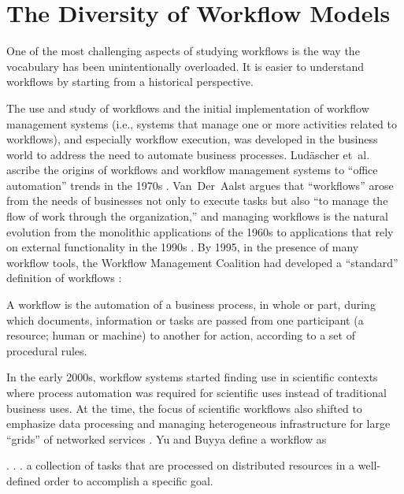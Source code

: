 \section{The Diversity of Workflow Models}\label{workflows}

One of the most challenging aspects of studying workflows is the way the
vocabulary has been unintentionally overloaded.  It is easier to
understand workflows by starting from a historical perspective.

The use and study of workflows and the initial implementation of workflow
management systems (i.e., systems that manage one or more activities related to
workflows), and especially workflow execution, was developed in the business
world to address the need to automate business processes. Lud\"{a}scher et~al. 
ascribe the origins of workflows and workflow management systems to ``office
automation'' trends in the 1970s \cite{ludascher_scientific_2006}.
Van~Der~Aalst argues that ``workflows'' arose from the needs of businesses not
only to execute tasks but also ``to manage the flow of work through
the organization,'' and managing workflows is the natural evolution from the
monolithic applications of the 1960s to applications that rely on external
functionality in the 1990s \cite{van_der_aalst_application_1998}. By 1995, in
the presence of many workflow tools, the Workflow Management Coalition had
developed a ``standard'' definition of workflows
\cite{hollingsworth_workflow_1993}:

\begin{displayquote} A workflow is the automation of a business process, in
whole or part, during which documents, information or tasks are passed from one
participant (a resource; human or machine) to another for action, according to a
set of procedural rules.  \end{displayquote}

In the early 2000s, workflow systems started finding use in scientific contexts
where process automation was required for scientific uses instead of traditional
business uses. At the time, the focus of scientific workflows also shifted to
emphasize data processing and managing heterogeneous infrastructure for
large ``grids'' of networked services \cite{yu_taxonomy_2005}. Yu and Buyya
define a workflow as 

\begin{displayquote}. . .  a collection of tasks that are processed on
distributed resources in a well-defined order to accomplish a specific
goal.\end{displayquote}

